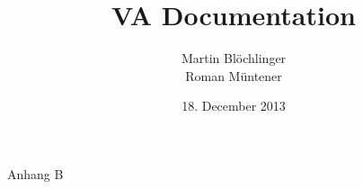 {\Huge{Anhang B}}
\newpage

\title{VA Documentation}
\date{18. December 2013}
\author{Martin Blöchlinger \\ Roman Müntener}
\maketitle
\thispagestyle{empty}
\newpage
